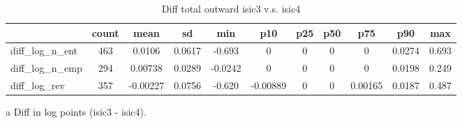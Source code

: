 \begin{table}[h]\scriptsize\caption{Diff total outward isic3 v.s. isic4}\centering
\begin{threeparttable}\begin{tabular}{l*{10}c}\toprule
            &       count&        mean&          sd&         min&         p10&         p25&         p50&         p75&         p90&         max\\
\midrule
diff\_log\_n\_ent&         463&      0.0106&      0.0617&      -0.693&           0&           0&           0&           0&      0.0274&       0.693\\
diff\_log\_n\_emp&         294&     0.00738&      0.0289&     -0.0242&           0&           0&           0&           0&      0.0198&       0.249\\
diff\_log\_rev&         357&    -0.00227&      0.0756&      -0.620&    -0.00889&           0&           0&     0.00165&      0.0187&       0.487\\
\bottomrule\end{tabular}\begin{tablenotes}
\item[a] Diff in log points (isic3 - isic4).
\end{tablenotes}\end{threeparttable}\end{table}
